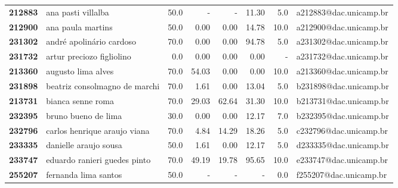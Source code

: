 \documentclass[11pt]{article}
\begin{document}
\begin{center}
\begin{landscape}
\begin{longtable}{llrrrrrl}
\bottomrule
\endlastfoot
\textbf{212883} &                    ana pasti villalba &                  50.0 &           - &           - &       11.30 &                      5.0 &  a212883@dac.unicamp.br \\
\textbf{212900} &                     ana paula martins &                  50.0 &        0.00 &        0.00 &       14.78 &                     10.0 &  a212900@dac.unicamp.br \\
\textbf{231302} &              andré apolinário cardoso &                  70.0 &        0.00 &        0.00 &       94.78 &                      5.0 &  a231302@dac.unicamp.br \\
\textbf{231732} &             artur preciozo figliolino &                   0.0 &        0.00 &        0.00 &        0.00 &                        - &  a231732@dac.unicamp.br \\
\textbf{213360} &                    augusto lima alves &                  70.0 &       54.03 &        0.00 &        0.00 &                     10.0 &  a213360@dac.unicamp.br \\
\textbf{231898} &         beatriz consolmagno de marchi &                  70.0 &        1.61 &        0.00 &       13.04 &                      5.0 &  b231898@dac.unicamp.br \\
\textbf{213731} &                     bianca senne roma &                  70.0 &       29.03 &       62.64 &       31.30 &                     10.0 &  b213731@dac.unicamp.br \\
\textbf{232395} &                   bruno bueno de lima &                  30.0 &        0.00 &        0.00 &       12.17 &                      7.0 &  b232395@dac.unicamp.br \\
\textbf{232796} &          carlos henrique araujo viana &                  70.0 &        4.84 &       14.29 &       18.26 &                      5.0 &  c232796@dac.unicamp.br \\
\textbf{233335} &                 danielle araujo sousa &                  50.0 &        1.61 &        0.00 &       12.17 &                      5.0 &  d233335@dac.unicamp.br \\
\textbf{233747} &          eduardo ranieri guedes pinto &                  70.0 &       49.19 &       19.78 &       95.65 &                     10.0 &  e233747@dac.unicamp.br \\
\textbf{255207} &                  fernanda lima santos &                  50.0 &           - &           - &           - &                      0.0 &  f255207@dac.unicamp.br \\

\end{longtable}
\end{landscape}
\end{center}
\end{document}
